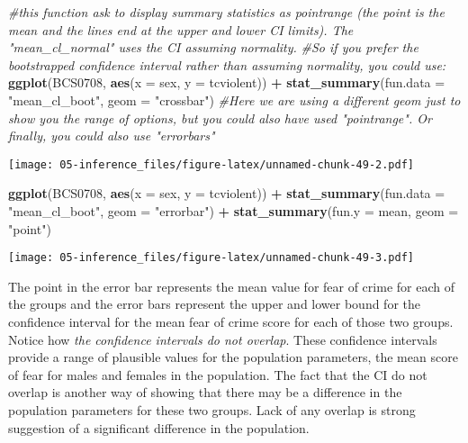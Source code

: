 \documentclass[
]{book}
\newenvironment{Shaded}{\begin{snugshade}}{\end{snugshade}}
\newcommand{\AttributeTok}[1]{\textcolor[rgb]{0.13,0.29,0.53}{#1}}
\newcommand{\CommentTok}[1]{\textcolor[rgb]{0.56,0.35,0.01}{\textit{#1}}}
\newcommand{\FunctionTok}[1]{\textcolor[rgb]{0.13,0.29,0.53}{\textbf{#1}}}
\newcommand{\NormalTok}[1]{#1}
\newcommand{\SpecialCharTok}[1]{\textcolor[rgb]{0.81,0.36,0.00}{\textbf{#1}}}
\newcommand{\StringTok}[1]{\textcolor[rgb]{0.31,0.60,0.02}{#1}}
\begin{document}
\begin{Shaded}
\begin{Highlighting}[]
\CommentTok{\#this function ask to display summary statistics as pointrange (the point is the mean and the lines end at the upper and lower CI limits). The "mean\_cl\_normal" uses the CI assuming normality.}
\CommentTok{\#So if you prefer the bootstrapped confidence interval rather than assuming normality, you could use:}
\FunctionTok{ggplot}\NormalTok{(BCS0708, }\FunctionTok{aes}\NormalTok{(}\AttributeTok{x =}\NormalTok{ sex, }\AttributeTok{y =}\NormalTok{ tcviolent)) }\SpecialCharTok{+}
       \FunctionTok{stat\_summary}\NormalTok{(}\AttributeTok{fun.data =} \StringTok{"mean\_cl\_boot"}\NormalTok{, }\AttributeTok{geom =} \StringTok{"crossbar"}\NormalTok{) }\CommentTok{\#Here we are using a different geom just to show you the range of options, but you could also have used "pointrange". Or finally, you could also use "errorbars"}
\end{Highlighting}
\end{Shaded}

\texttt{[image: 05-inference\_files/figure-latex/unnamed-chunk-49-2.pdf]}

\begin{Shaded}
\begin{Highlighting}[]
\FunctionTok{ggplot}\NormalTok{(BCS0708, }\FunctionTok{aes}\NormalTok{(}\AttributeTok{x =}\NormalTok{ sex, }\AttributeTok{y =}\NormalTok{ tcviolent)) }\SpecialCharTok{+}
       \FunctionTok{stat\_summary}\NormalTok{(}\AttributeTok{fun.data =} \StringTok{"mean\_cl\_boot"}\NormalTok{, }\AttributeTok{geom =} \StringTok{"errorbar"}\NormalTok{) }\SpecialCharTok{+}
        \FunctionTok{stat\_summary}\NormalTok{(}\AttributeTok{fun.y =}\NormalTok{ mean, }\AttributeTok{geom =} \StringTok{"point"}\NormalTok{)}
\end{Highlighting}
\end{Shaded}

\texttt{[image: 05-inference\_files/figure-latex/unnamed-chunk-49-3.pdf]}

The point in the error bar represents the mean value for fear of crime for each of the groups and the error bars represent the upper and lower bound for the confidence interval for the mean fear of crime score for each of those two groups. Notice how \emph{the confidence intervals do not overlap}. These confidence intervals provide a range of plausible values for the population parameters, the mean score of fear for males and females in the population. The fact that the CI do not overlap is another way of showing that there may be a difference in the population parameters for these two groups. Lack of any overlap is strong suggestion of a significant difference in the population.
\end{document}
